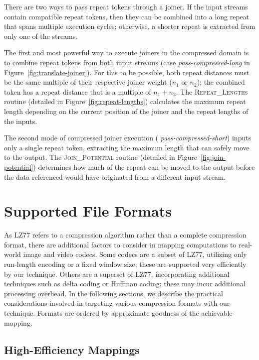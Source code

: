 There are two ways to pass repeat tokens through a joiner.  If the
input streams contain compatible repeat tokens, then they can be
combined into a long repeat that spans multiple execution cycles;
otherwise, a shorter repeat is extracted from only one of the streams.

The first and most powerful way to execute joiners in the compressed
domain is to combine repeat tokens from both input streams (case {\it
  pass-compressed-long} in Figure~\ref{fig:translate-joiner}).  For this to
be possible, both repeat distances must be the same multiple of their
respective joiner weight ($n_1$ or $n_2$); the combined token has a
repeat distance that is a multiple of $n_1 + n_2$.  The
\textsc{Repeat\_Lengths} routine (detailed in
Figure~\ref{fig:repeat-lengths}) calculates the maximum repeat length
depending on the current position of the joiner and the repeat lengths
of the inputs.

The second mode of compressed joiner execution ({\it
  pass-compressed-short}) inputs only a single repeat token,
extracting the maximum length that can safely move to the output.  The
\textsc{Join\_Potential} routine (detailed in
Figure~\ref{fig:join-potential}) determines how much of the repeat can
be moved to the output before the data referenced would have
originated from a different input stream.

\section{Supported File Formats}
\label{sec:formats}

As LZ77 refers to a compression algorithm rather than a complete
compression format, there are additional factors to consider in
mapping computations to real-world image and video codecs.  Some
codecs are a subset of LZ77, utilizing only run-length encoding or a
fixed window size; these are supported very efficiently by our
technique.  Others are a superset of LZ77, incorporating additional
techniques such as delta coding or Huffman coding; these may incur
additional processing overhead.  In the following sections, we
describe the practical considerations involved in targeting various
compression formats with our technique.  Formats are ordered by
approximate goodness of the achievable mapping.

\subsection*{High-Efficiency Mappings}
\label{sec:formats-good}

